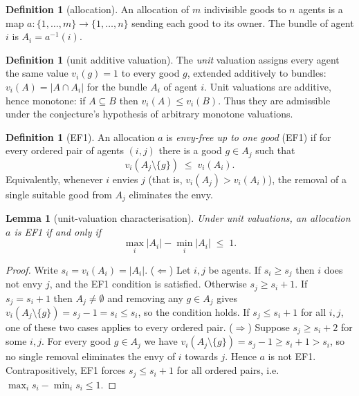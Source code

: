 \documentclass[11pt]{article}
\newtheorem{lemma}[theorem]{Lemma}
\theoremstyle{definition}
\newtheorem{definition}[theorem]{Definition}
\theoremstyle{remark}
\begin{document}
\begin{definition}[allocation]
An allocation of $m$ indivisible goods to $n$ agents is a map
$a : \{1,\dots,m\} \to \{1,\dots,n\}$ sending each good to its owner. The bundle
of agent $i$ is $A_i = a^{-1}(i)$.
\end{definition}

\begin{definition}[unit additive valuation]
The \emph{unit} valuation assigns every agent the same value $v_i(g) = 1$ to
every good $g$, extended additively to bundles: $v_i(A) = |A \cap A_i|$ for the
bundle $A_i$ of agent $i$. Unit valuations are additive, hence monotone: if
$A \subseteq B$ then $v_i(A) \le v_i(B)$. Thus they are admissible under the
conjecture's hypothesis of arbitrary monotone valuations.
\end{definition}

\begin{definition}[EF1]
An allocation $a$ is \emph{envy-free up to one good} (EF1) if for every ordered
pair of agents $(i,j)$ there is a good $g \in A_j$ such that
\[
v_i(A_j \setminus \{g\}) \;\le\; v_i(A_i).
\]
Equivalently, whenever $i$ envies $j$ (that is, $v_i(A_j) > v_i(A_i)$), the
removal of a single suitable good from $A_j$ eliminates the envy.
\end{definition}

\begin{lemma}[unit-valuation characterisation]\label{lem:gap}
Under unit valuations, an allocation $a$ is EF1 if and only if
\[
\max_i |A_i| - \min_i |A_i| \;\le\; 1 .
\]
\end{lemma}

\begin{proof}
Write $s_i = v_i(A_i) = |A_i|$.
($\Leftarrow$) Let $i,j$ be agents. If $s_i \ge s_j$ then $i$ does not envy $j$,
and the EF1 condition is satisfied. Otherwise $s_j \ge s_i + 1$. If
$s_j = s_i + 1$ then $A_j \neq \emptyset$ and removing any $g \in A_j$ gives
$v_i(A_j \setminus \{g\}) = s_j - 1 = s_i \le s_i$, so the condition holds. If
$s_j \le s_i + 1$ for all $i,j$, one of these two cases applies to every ordered
pair.
($\Rightarrow$) Suppose $s_j \ge s_i + 2$ for some $i,j$. For every good
$g \in A_j$ we have $v_i(A_j \setminus \{g\}) = s_j - 1 \ge s_i + 1 > s_i$, so
no single removal eliminates the envy of $i$ towards $j$. Hence $a$ is not EF1.
Contrapositively, EF1 forces $s_j \le s_i + 1$ for all ordered pairs, i.e.
$\max_i s_i - \min_i s_i \le 1$.
\end{proof}
\end{document}
